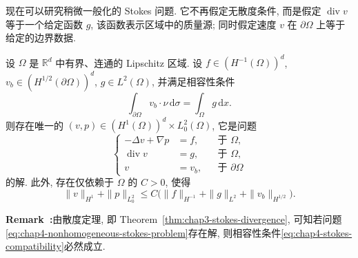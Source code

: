 现在可以研究稍微一般化的 Stokes 问题. 它不再假定无散度条件, 而是假定 $\operatorname{div}v$ 等于一个给定函数 $g$, 该函数表示区域中的质量源; 同时假定速度 $v$ 在 $\partial\Omega$ 上等于给定的边界数据.

\begin{Theorem}
\label{thm:chap4-stokes-nonhomogeneous-wellposedness}
设 $\Omega$ 是 $\mathbb R^d$ 中有界、连通的 Lipschitz 区域. 设 $f\in(H^{-1}(\Omega))^d$, $v_b\in(H^{1/2}(\partial\Omega))^d$, $g\in L^2(\Omega)$, 并满足相容性条件
\begin{equation}
 \int_{\partial\Omega}v_b\cdot\nu\,\mathrm d\sigma
 =\int_\Omega g\,\mathrm dx.
 \label{eq:chap4-stokes-compatibility}
\end{equation}
则存在唯一的 $(v,p)\in(H^1(\Omega))^d\times L_0^2(\Omega)$, 它是问题
\begin{equation}
 \left\{
 \begin{aligned}
  -\Delta v+\nabla p&=f,&&\text{于 }\Omega,\\
  \operatorname{div}v&=g,&&\text{于 }\Omega,\\
  v&=v_b,&&\text{于 }\partial\Omega
 \end{aligned}
 \right.
 \label{eq:chap4-nonhomogeneous-stokes-problem}
\end{equation}
的解. 此外, 存在仅依赖于 $\Omega$ 的 $C>0$, 使得
\[
 \|v\|_{H^1}+\|p\|_{L_0^2}
 \leq C\bigl(\|f\|_{H^{-1}}+\|g\|_{L^2}+\|v_b\|_{H^{1/2}}\bigr).
\]
\end{Theorem}

\par\noindent{}\textbf{Remark~\thechapterfoursectionfiveremark:}\label{rem:chap4-stokes-compatibility-necessary}\quad 由散度定理, 即 Theorem~\ref{thm:chap3-stokes-divergence}, 可知若问题\eqref{eq:chap4-nonhomogeneous-stokes-problem}存在解, 则相容性条件\eqref{eq:chap4-stokes-compatibility}必然成立.

